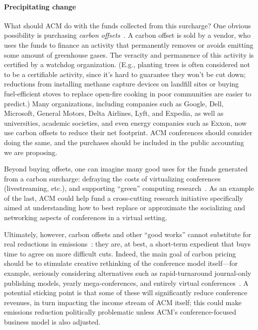\documentclass[12pt]{article}
\newcommand{\bcp}[1]{\ifdraft{\bf\textcolor{darkred}{[\bf bcp: #1]}}\fi}
\newcommand{\PARAGRAPH}{\paragraph*}
\begin{document}
\PARAGRAPH{Precipitating change}
%
What should ACM do with the funds collected from this surcharge?  One
obvious possibility is purchasing \emph{carbon offsets}~\cite{CarbonOFfsetReport}.
%
A carbon offset is sold by a vendor, who uses the funds to finance an
activity that permanently removes or avoids emitting some amount of
greenhouse gases.  The veracity and permanence of this activity is certified
by a watchdog organization. (E.g., planting trees is often considered not to
be a certifiable
activity, since it's hard to guarantee they won't be cut down;
reductions from
installing methane capture devices on landfill sites or buying
fuel-efficient stoves to replace open-fire cooking in poor communities are
easier to predict.)
Many organizations, including companies such as Google, Dell, Microsoft,
General Motors, Delta Airlines, Lyft, and Expedia, as well as universities,
academic societies, and even energy companies such as Exxon, now use
carbon offsets to reduce their
net footprint. ACM conferences should consider doing the same, and the
purchases should be
included in the public accounting we are proposing.

Beyond buying offsets, one can
imagine many good uses for the funds generated from a carbon surcharge: defraying the costs of
virtualizing conferences (livestreaming, etc.), and supporting ``green''
computing research~\cite{rolnick2019tackling}.  As an example
of the last, ACM could help fund a
cross-cutting research initiative specifically aimed at understanding how to
best replace or approximate the socializing and networking aspects of
conferences in a virtual setting.

Ultimately, however, carbon offsets and other ``good works'' cannot
substitute for real reductions in emissions~\cite{anderson2012inconvenient,
  carbon-offsets-are-not-our-get-out-jail-free-card}: they are, at best, a
short-term expedient that buys time to agree on more
difficult cuts.
%
Indeed, the main goal of carbon pricing should be to stimulate creative
rethinking of the conference model itself---for example, seriously
considering alternatives such as rapid-turnaround journal-only publishing
models, yearly mega-conferences, and entirely virtual
conferences~\cite{NCN}.
%
A potential sticking point is that some of these will significantly reduce
conference revenues, in turn impacting the income stream of ACM itself; this
could make emissions reduction politically problematic unless ACM's
conference-focused business model is also adjusted.
\end{document}
